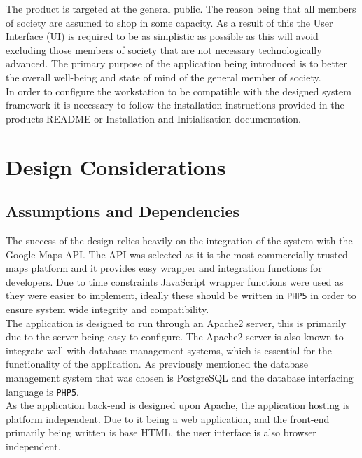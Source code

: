 \documentclass[10pt, a4paper, onecolumn]{scrartcl}
\begin{document}
		The product is targeted at the general public. The reason being that all members of society are assumed to shop in some capacity. As a result of this the User Interface (UI) is required to be as simplistic as possible as this will avoid excluding those members of society that are not necessary technologically advanced. The primary purpose of the application being introduced is to better the overall well-being and state of mind of the general member of society. \\
		
		In order to configure the workstation to be compatible with the designed system framework it is necessary to follow the installation instructions provided in the products README or Installation and Initialisation documentation.
		
	\section{Design Considerations}
	
		\subsection{Assumptions and Dependencies}
		
			The success of the design relies heavily on the integration of the system with the Google Maps API. The API was selected as it is the most commercially trusted maps platform and it provides easy wrapper and integration functions for developers. Due to time constraints JavaScript wrapper functions were used as they were easier to implement, ideally these should be written in \texttt{PHP5} in order to ensure system wide integrity and compatibility. \\
			
			The application is designed to run through an Apache2 server, this is primarily due to the server being easy to configure. The Apache2 server is also known to integrate well with database management systems, which is essential for the functionality of the application. As previously mentioned the database management system that was chosen is PostgreSQL and the database interfacing language is \texttt{PHP5}. \\
			
			As the application back-end is designed upon Apache, the application hosting is platform independent. Due to it being a web application, and the front-end primarily being written is base HTML, the user interface is also browser independent. \\
			
\end{document}
